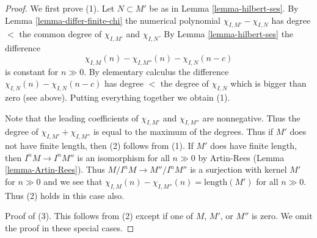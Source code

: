 \begin{proof}
We first prove (1). Let $N \subset M'$ be as in Lemma \ref{lemma-hilbert-ses}.
By Lemma \ref{lemma-differ-finite-chi} the numerical polynomial
$\chi_{I, M'} - \chi_{I, N}$ has degree $<$ the common degree of
$\chi_{I, M'}$ and $\chi_{I, N}$. By Lemma \ref{lemma-hilbert-ses}
the difference
$$
\chi_{I, M}(n) - \chi_{I, M''}(n) - \chi_{I, N}(n - c)
$$
is constant for $n \gg 0$. By elementary calculus the difference
$\chi_{I, N}(n) - \chi_{I, N}(n - c)$ has degree $<$ the degree of
$\chi_{I, N}$ which is bigger than zero (see above). Putting everything
together we obtain (1).

\medskip\noindent
Note that the leading coefficients of $\chi_{I, M'}$ and $\chi_{I, M''}$ are
nonnegative. Thus the degree of $\chi_{I, M'} + \chi_{I, M''}$ is equal
to the maximum of the degrees. Thus if $M'$ does not have finite
length, then (2) follows from (1). If $M'$ does have finite length, then
$I^nM \to I^nM''$ is an isomorphism for all $n \gg 0$ by Artin-Rees
(Lemma \ref{lemma-Artin-Rees}). Thus $M/I^nM \to M''/I^nM''$ is a
surjection with kernel $M'$ for $n \gg 0$ and we see that
$\chi_{I, M}(n) - \chi_{I, M''}(n) = \text{length}(M')$
for all $n \gg 0$. Thus (2) holds in this case also.

\medskip\noindent
Proof of (3). This follows from (2) except if one of $M$, $M'$, or $M''$
is zero. We omit the proof in these special cases.
\end{proof}



































